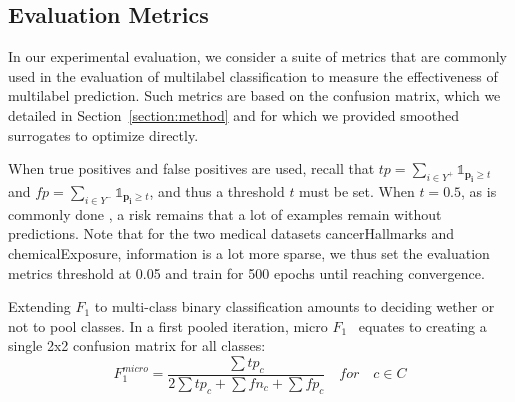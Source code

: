 





\subsection{Evaluation Metrics}
\label{sec:org23c8447}

In our experimental evaluation, we consider a suite of metrics that are commonly used in the evaluation of multilabel classification to measure the effectiveness of multilabel prediction. Such metrics are based on the confusion matrix, which we detailed in Section~\ref{section:method} and for which we provided smoothed surrogates to optimize directly.

When true positives and false positives are used, recall that \(t p=\sum_{i \in Y^{+}} \mathds{1}_{\mathbf{p_i} \geq t}\) and \(f p=\sum_{i \in Y^{-}} \mathds{1}_{\mathbf{p_i} \geq t}\), and thus a threshold \(t\) must be set. When \(t = 0.5\), as is commonly done , a risk remains that a lot of examples remain without predictions. 
Note that for the two medical datasets cancerHallmarks and chemicalExposure, information is a lot more sparse, we thus set the evaluation metrics threshold at 0.05 and train for 500 epochs until reaching convergence. 

Extending \(F_1\) to multi-class binary classification amounts to deciding wether or not to pool classes.
In a first pooled iteration, micro \(F_1\)~\cite{multilabelMetrics} equates to creating a single 2x2 confusion matrix for all classes:
$$F_1^{micro} = \frac{\sum tp_c}{2 \sum tp_c + \sum fn_c + \sum fp_c} \quad for \quad c \in C$$

